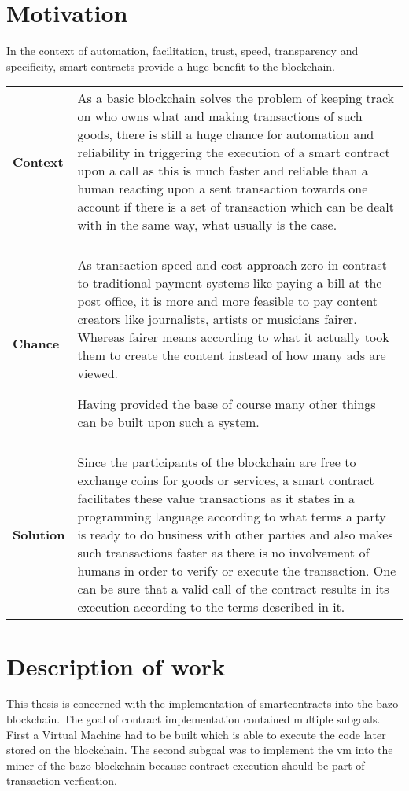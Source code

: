 \section{Motivation}
In the context of automation, facilitation, trust, speed, transparency and specificity, smart contracts provide a huge benefit to the blockchain.

\begin{tabular}[t]{ p{3cm} p{12.5cm}}
\textbf{Context} & 
As a basic blockchain solves the problem of keeping track on who owns what and making transactions of such goods, there is still a huge chance for automation and reliability in triggering the execution of a smart contract upon a call as this is much faster and reliable than a human reacting upon a sent transaction towards one account if there is a set of transaction which can be dealt with in the same way, what usually is the case.  \\ \\

\textbf{Chance} & 
As transaction speed and cost approach zero in contrast to traditional payment systems like paying a bill at the post office, it is more and more feasible to pay content creators like journalists, artists or musicians fairer. Whereas fairer means according to what it actually took them to create the content instead of how many ads are viewed.

Having provided the base of course many other things can be built upon such a system.\\ \\

\textbf{Solution} & 
Since the participants of the blockchain are free to exchange coins for goods or services, a smart contract facilitates these value transactions as it states in a programming language according to what terms a party is ready to do business with other parties and also makes such transactions faster as there is no involvement of humans in order to verify or execute the transaction. One can be sure that a valid call of the contract results in its execution according to the terms described in it.
\end{tabular}

\section{Description of work}
This thesis is concerned with the implementation of smartcontracts into the bazo blockchain. The goal of contract implementation contained multiple subgoals. First a Virtual Machine had to be built which is able to execute the code later stored on the blockchain. The second subgoal was to implement the vm into the miner of the bazo blockchain because contract execution should be part of transaction verfication.